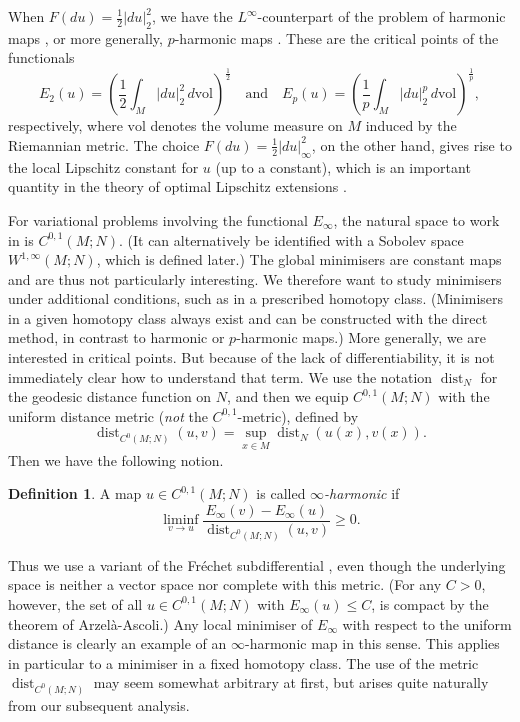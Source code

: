 \documentclass[a4paper]{article}
\newcommand{\vol}{\mathrm{vol}}
\DeclareMathOperator{\dist}{dist}
\theoremstyle{definition}
\newtheorem{definition}[theorem]{Definition}
\theoremstyle{remark}
\begin{document}
When $F(du) = \frac{1}{2} |du|_2^2$, we have the $L^\infty$-counterpart of
the problem of harmonic maps \cite{Eells-Lemaire:78, Eells-Lemaire:88}, or more generally, $p$-harmonic maps \cite{Wei:08}.
These are the critical points of the functionals
\[
E_2(u) = \left(\frac{1}{2} \int_M |du|_2^2 \, d\vol\right)^{\frac{1}{2}} \quad \text{and} \quad E_p(u) = \left(\frac{1}{p} \int_M |du|_2^p \, d\vol\right)^{\frac{1}{p}},
\]
respectively, where $\vol$ denotes the volume measure on $M$ induced by the Riemannian metric. The choice $F(du) = \frac{1}{2} |du|_\infty^2$, on the other
hand, gives rise to the local Lipschitz constant for $u$ (up to a constant),
which is an important quantity in the theory of optimal Lipschitz extensions \cite{Aronsson:67, Jensen:93, Crandall-Evans-Gariepy:01, Sheffield-Smart:12}.

For variational problems involving the functional $E_\infty$, the natural space to work in is $C^{0, 1}(M; N)$. (It can alternatively be identified
with a Sobolev space $W^{1, \infty}(M; N)$, which is defined later.)
The global minimisers are constant maps and are thus not particularly
interesting. We therefore want to study minimisers under additional conditions,
such as in a prescribed homotopy class.
(Minimisers in a given homotopy class always exist and can be constructed
with the direct method, in contrast to harmonic or $p$-harmonic maps.)
More generally, we are interested in critical points.
But because of the lack of differentiability, it is not immediately clear how to understand that term.
We use the notation $\dist_N$ for the geodesic distance function on $N$, and
then we equip $C^{0, 1}(M; N)$ with the uniform distance metric (\emph{not}
the $C^{0, 1}$-metric), defined by
\[
\dist_{C^0(M; N)}(u, v) = \sup_{x \in M} \dist_N(u(x), v(x)).
\]
Then we have the following notion.

\begin{definition} \label{def:infinity-harmonic}
A map $u \in C^{0, 1}(M; N)$ is called \emph{$\infty$-harmonic} if
\[
\liminf_{v \to u} \frac{E_\infty(v) - E_\infty(u)}{\dist_{C^0(M; N)}(u, v)} \ge 0.
\]
\end{definition}

Thus we use a variant of the Fr\'echet subdifferential \cite{Kruger:03},
even though the underlying space is neither a vector space nor complete with this metric.
(For any $C > 0$, however, the set of all $u \in C^{0, 1}(M; N)$ with $E_\infty(u) \le C$, is
compact by the theorem of Arzel\`a-Ascoli.)
Any local minimiser of $E_\infty$ with respect to the uniform
distance is clearly an example of an $\infty$-harmonic map in this sense.
This applies in particular to a minimiser in a fixed homotopy class.
The use of the metric $\dist_{C^0(M; N)}$ may seem somewhat
arbitrary at first, but arises quite naturally from our subsequent analysis.
\end{document}
